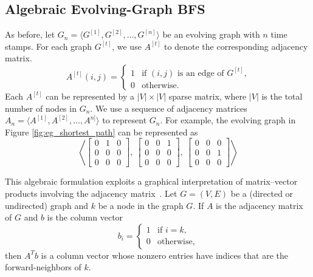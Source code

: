 \documentclass[11pt,conference,compsocconf]{IEEEtran}
\theoremstyle{definition}
\begin{document}
\subsection{Algebraic Evolving-Graph BFS}
\label{sec:representation}
As before, let $G_n = \langle G^{[1]}, G^{[2]}, \ldots, G^{[n]}\rangle$ be an evolving graph with $n$ time stamps. For each graph $G^{[t]}$, we use $A^{[t]}$ to denote
the corresponding adjacency matrix.
\[
A^{[t]}(i,j) =
\begin{cases}
 1 & \mbox{if $(i,j)$ is an edge of $G^{[t]}$,} \\
 0 & \mbox{otherwise.}
\end{cases}
\]
 Each $A^{[t]}$ can be represented by
a $|V|\times |V|$ sparse matrix,
where $|V|$ is the total number of nodes in $G_n$.
We use a sequence of adjacency matrices $A_n = \langle A^{[1]}, A^{[2]}, \ldots, A^{n]}\rangle$ to represent $G_n$.
For example, the evolving graph in Figure \ref{fig:eg_shortest_path}
can be represented as
\[
\left\langle
  \begin{bmatrix}
    0 & 1 & 0 \\
    0 & 0 & 0 \\
    0 & 0 & 0
  \end{bmatrix},~
 \begin{bmatrix}
   0 & 0 & 1 \\
   0 & 0 & 0 \\
   0 & 0 & 0
 \end{bmatrix},~
 \begin{bmatrix}
  0 & 0 & 0 \\
  0 & 0 & 1 \\
  0 & 0 & 0
 \end{bmatrix}
\right\rangle
\]


This algebraic formulation exploits a graphical interpretation of matrix--vector
products involving the adjacency matrix~\cite{kegi11}.
Let $G = (V, E)$ be a (directed or undirected) graph
and $k$ be a node in the graph $G$. If $A$ is the adjacency matrix of $G$ and
$b$ is the column vector
\[
b_i =
\begin{cases}
1 & \mbox{if $i = k$,} \\
0 & \mbox{otherwise,}
\end{cases}
\]
then $A^Tb$ is a column vector whose nonzero entries have indices that are the
forward-neighbors of $k$.
\end{document}

